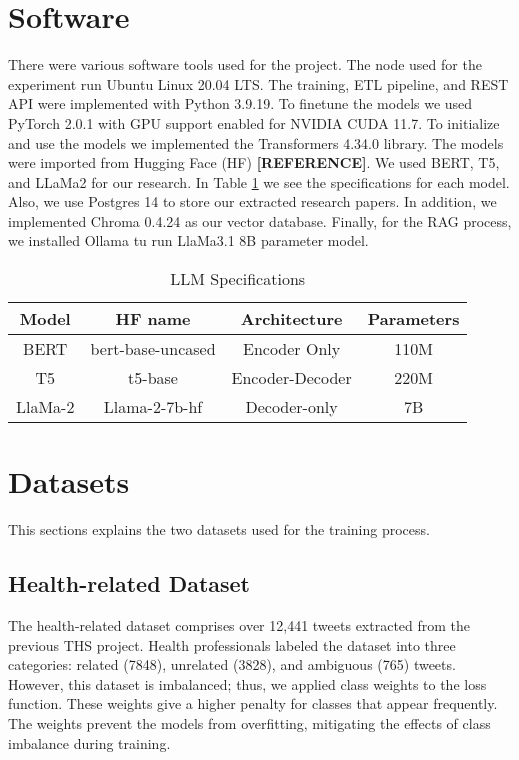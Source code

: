 \section{Software}
There were various software tools used for the project. The node used for the experiment run Ubuntu Linux 20.04 LTS. The training, ETL pipeline,
and REST API were implemented with Python 3.9.19. To finetune the models we used PyTorch 2.0.1 with GPU support enabled for
NVIDIA CUDA 11.7. To initialize and use the models we implemented the Transformers  4.34.0 library. The models were imported from
Hugging Face (HF) \textbf{[REFERENCE]}. We used BERT, T5, and LLaMa2 for our research. In Table \ref{table:LLM} we see the specifications
for each model. Also, we use Postgres 14 to store our extracted research papers. In addition, we implemented Chroma 0.4.24 as our vector database.
Finally, for the RAG process, we installed Ollama tu run LlaMa3.1 8B parameter model. 


  \begin{table}[ht!]
\centering
\caption{LLM Specifications}
\begin{tabular}{||c | c | c | c||} 
 \hline
\textbf{Model} & \textbf{HF name} & \textbf{Architecture} & \textbf{Parameters} \\ [0.5ex] 
 \hline
 BERT & bert-base-uncased & Encoder Only & 110M \\ 
 \hline
 T5 & t5-base & Encoder-Decoder & 220M \\
 \hline
 LlaMa-2 & Llama-2-7b-hf & Decoder-only & 7B \\
 \hline
\end{tabular}
\label{table:LLM}
\end{table}
 


\section{Datasets}

This sections explains the two datasets used for the training process.

\subsection{Health-related Dataset}
The health-related dataset comprises over 12,441 tweets extracted from the previous THS project. Health professionals labeled the dataset into three categories: related (7848),
unrelated (3828), and ambiguous (765) tweets. However, this dataset is imbalanced; thus, we applied class weights to the loss function. These weights give a higher penalty for
classes that appear frequently. The weights prevent the models from overfitting, mitigating the effects of class imbalance during training.

